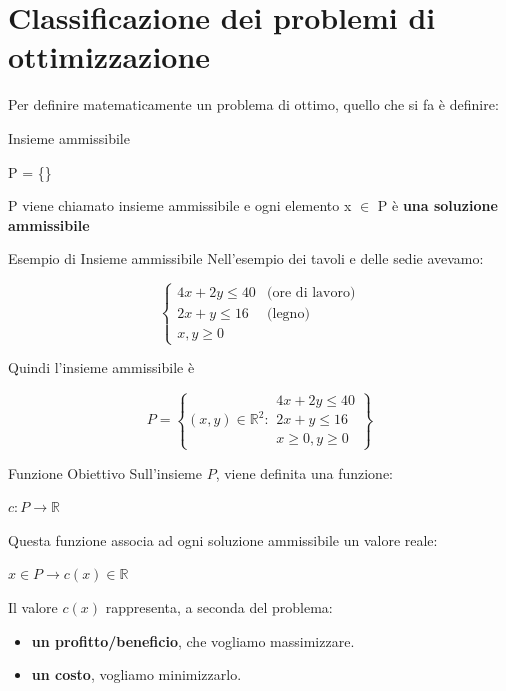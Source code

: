 \section{Classificazione dei problemi di ottimizzazione}
Per definire matematicamente un problema di ottimo, quello che si fa è definire:
\begin{definition}{Insieme ammissibile}
    \begin{center}
        P = \{\}
    \end{center}
    P viene chiamato insieme ammissibile e ogni elemento x $\in$ P è \textbf{una soluzione ammissibile}
\end{definition}
\begin{example}{Esempio di Insieme ammissibile}
    Nell'esempio dei tavoli e delle sedie avevamo:
    \begin{center}
        $$
        \begin{cases}
        4x + 2y \le 40 & \text{(ore di lavoro)} \\
        2x + y \le 16 & \text{(legno)} \\
        x, y \ge 0
        \end{cases}
        $$
    \end{center}
    Quindi l'insieme ammissibile è 
    \begin{center}
        $$
        P = \left\{ (x,y) \in \mathbb{R}^2 : 
        \begin{array}{l}
        4x + 2y \le 40 \\
        2x + y \le 16 \\
        x \ge 0, y \ge 0
        \end{array} 
        \right\}
        $$
    \end{center}
\end{example}
\begin{definition}{Funzione Obiettivo}
    Sull'insieme $P$, viene definita una funzione:
    \begin{center}
        $c : P \to \mathbb{R}$
    \end{center}
    Questa funzione associa ad ogni soluzione ammissibile un valore reale:
    \begin{center}
           $x \in P \to c(x) \in \mathbb{R}$
    \end{center}
    Il valore \(c(x)\) rappresenta, a seconda del problema:
    \begin{itemize}
        \item \textbf{un profitto/beneficio}, che vogliamo massimizzare.
        \item \textbf{un costo}, vogliamo minimizzarlo.
    \end{itemize}
\end{definition}
